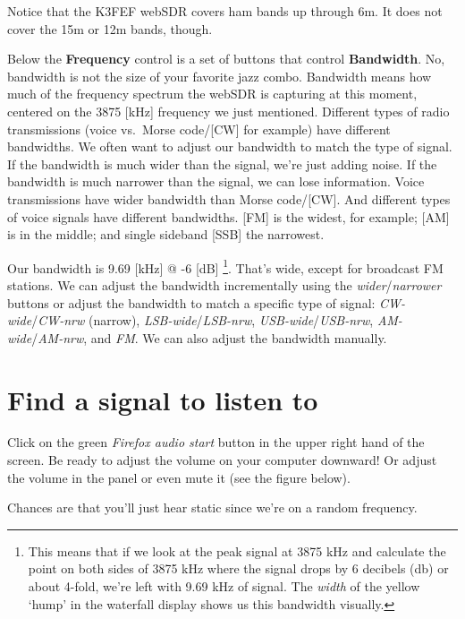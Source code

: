 \documentclass[
  letterpaper,
  DIV=11,
  numbers=noendperiod]{scrreport}
\begin{document}
Notice that the K3FEF webSDR covers ham bands up through 6m. It does not
cover the 15m or 12m bands, though.

Below the \textbf{Frequency} control is a set of buttons that control
\textbf{Bandwidth}. No, bandwidth is not the size of your favorite jazz
combo. Bandwidth means how much of the frequency spectrum the webSDR is
capturing at this moment, centered on the 3875 {[}kHz{]} frequency we
just mentioned. Different types of radio transmissions (voice vs.~Morse
code/{[}CW{]} for example) have different bandwidths. We often want to
adjust our bandwidth to match the type of signal. If the bandwidth is
much wider than the signal, we're just adding noise. If the bandwidth is
much narrower than the signal, we can lose information. Voice
transmissions have wider bandwidth than Morse code/{[}CW{]}. And
different types of voice signals have different bandwidths. {[}FM{]} is
the widest, for example; {[}AM{]} is in the middle; and single sideband
{[}SSB{]} the narrowest.

Our bandwidth is 9.69 {[}kHz{]} @ -6 {[}dB{]} \footnote{This means that
  if we look at the peak signal at 3875 kHz and calculate the point on
  both sides of 3875 kHz where the signal drops by 6 decibels (db) or
  about 4-fold, we're left with 9.69 kHz of signal. The \emph{width} of
  the yellow `hump' in the waterfall display shows us this bandwidth
  visually.}. That's wide, except for broadcast FM stations. We can
adjust the bandwidth incrementally using the
\emph{wider}/\emph{narrower} buttons or adjust the bandwidth to match a
specific type of signal: \emph{CW-wide}/\emph{CW-nrw} (narrow),
\emph{LSB-wide}/\emph{LSB-nrw}, \emph{USB-wide}/\emph{USB-nrw},
\emph{AM-wide}/\emph{AM-nrw}, and \emph{FM}. We can also adjust the
bandwidth manually.

\hypertarget{find-a-signal-to-listen-to}{%
\section*{Find a signal to listen to}\label{find-a-signal-to-listen-to}}


Click on the {green} \emph{Firefox audio start} button in the upper
right hand of the screen. Be ready to adjust the volume on your computer
downward! Or adjust the volume in the panel or even mute it (see the
figure below).

Chances are that you'll just hear static since we're on a random
frequency.
\end{document}
